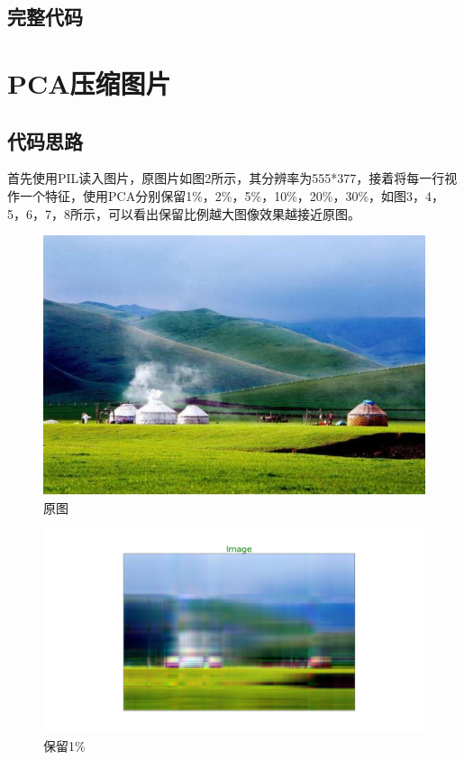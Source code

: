 \documentclass[12pt, a4paper, oneside, fontset=windows]{ctexart}
\begin{document}
\subsection{完整代码}

\section{PCA压缩图片}
\subsection{代码思路}
首先使用PIL读入图片，原图片如图2所示，其分辨率为555*377，接着将每一行视作一个特征，使用PCA分别保留1\%，2\%，5\%，10\%，20\%，30\%，如图3，4，5，6，7，8所示，可以看出保留比例越大图像效果越接近原图。
\begin{figure}[htbp]
    \centering
    \includegraphics[scale = 0.5]{test.jpg}
    \caption{原图}
\end{figure}
\begin{figure}[htbp]
    \centering
    \includegraphics[scale = 0.3]{1.png}
    \caption{保留1\%}
\end{figure}
\end{document}
